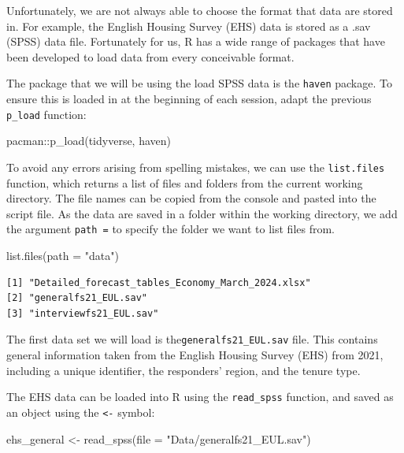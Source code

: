 \documentclass[
  letterpaper,
  DIV=11,
  numbers=noendperiod]{scrreprt}
\newenvironment{Shaded}{\begin{snugshade}}{\end{snugshade}}
\newcommand{\AttributeTok}[1]{\textcolor[rgb]{0.40,0.45,0.13}{#1}}
\newcommand{\FunctionTok}[1]{\textcolor[rgb]{0.28,0.35,0.67}{#1}}
\newcommand{\NormalTok}[1]{\textcolor[rgb]{0.00,0.23,0.31}{#1}}
\newcommand{\OtherTok}[1]{\textcolor[rgb]{0.00,0.23,0.31}{#1}}
\newcommand{\SpecialCharTok}[1]{\textcolor[rgb]{0.37,0.37,0.37}{#1}}
\newcommand{\StringTok}[1]{\textcolor[rgb]{0.13,0.47,0.30}{#1}}
\begin{document}
Unfortunately, we are not always able to choose the format that data are
stored in. For example, the English Housing Survey (EHS) data is stored
as a .sav (SPSS) data file. Fortunately for us, R has a wide range of
packages that have been developed to load data from every conceivable
format.

The package that we will be using the load SPSS data is the
\texttt{haven} package. To ensure this is loaded in at the beginning of
each session, adapt the previous \texttt{p\_load} function:

\begin{Shaded}
\begin{Highlighting}[]
\NormalTok{pacman}\SpecialCharTok{::}\FunctionTok{p\_load}\NormalTok{(tidyverse, haven)}
\end{Highlighting}
\end{Shaded}

To avoid any errors arising from spelling mistakes, we can use the
\texttt{list.files} function, which returns a list of files and folders
from the current working directory. The file names can be copied from
the console and pasted into the script file. As the data are saved in a
folder within the working directory, we add the argument
\texttt{path\ =} to specify the folder we want to list files from.

\begin{Shaded}
\begin{Highlighting}[]
\FunctionTok{list.files}\NormalTok{(}\AttributeTok{path =} \StringTok{"data"}\NormalTok{)}
\end{Highlighting}
\end{Shaded}

\begin{verbatim}
[1] "Detailed_forecast_tables_Economy_March_2024.xlsx"
[2] "generalfs21_EUL.sav"                             
[3] "interviewfs21_EUL.sav"                           
\end{verbatim}

The first data set we will load is the\texttt{generalfs21\_EUL.sav}
file. This contains general information taken from the English Housing
Survey (EHS) from 2021, including a unique identifier, the responders'
region, and the tenure type.

The EHS data can be loaded into R using the \texttt{read\_spss}
function, and saved as an object using the \texttt{\textless{}-} symbol:

\begin{Shaded}
\begin{Highlighting}[]
\NormalTok{ehs\_general }\OtherTok{\textless{}{-}} \FunctionTok{read\_spss}\NormalTok{(}\AttributeTok{file =} \StringTok{"Data/generalfs21\_EUL.sav"}\NormalTok{)}
\end{Highlighting}
\end{Shaded}
\end{document}

